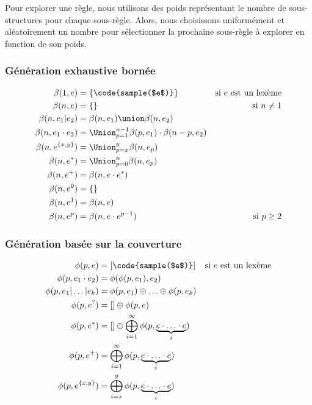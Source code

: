 Pour explorer une règle, nous utilisons des poids représentant le nombre de
sous-structures pour chaque sous-règle. Alors, nous choisissons uniformément et
aléatoirement un nombre pour sélectionner la prochaine sous-règle à explorer en
fonction de son poids.

\subsubsection{Génération exhaustive bornée}
\label{subsection:data:bounded_exaustive_generation}

\begin{align*}
%
\beta(1, e) & =
    \{\code{sample($e$)}\}
    &
    \text{si $e$ est un lexème}
    \\
%
\beta(n, e) & =
    \{\}
    &
    \text{si $n \neq 1$}
    \\
%
\beta(n, e_1 \vert e_2) & =
    \beta(n, e_1) \union \beta(n, e_2)
    \\
%
\beta(n, e_1 \cdot e_2) & =
    \Union_{p = 1}^{n - 1}
    \beta(p, e_1) \cdot \beta(n - p, e_2)
    \\
%
\beta(n, e^{\{x, y\}}) & =
    \Union_{p = x}^y \beta(n, e_p)
    \\
%
\beta(n, e^*) & =
    \Union_{p = 0}^n \beta(n, e_p)
    \\
%
\beta(n, e^+) & =
    \beta(n, e \cdot e^*)
    \\
%
\beta(n, e^0) & =
    \{\}
    \\
%
\beta(n, e^1) & =
    \beta(n, e)
    \\
%
\beta(n, e^p) & =
    \beta(n, e \cdot e^{p - 1})
    &
    \text{si $p \geq 2$}
%
\end{align*}

\subsubsection{Génération basée sur la couverture}
\label{subsection:data:coverage_based_generation}

\begin{align*}
%
\phi(p, e) & =
    [\code{sample($e$)}]
    &
    \text{si $e$ est un lexème}
    \\
%
\phi(p, e_1 \cdot e_2) & =
    \phi(\phi(p, e_1), e_2)
    \\
%
\phi(p, e_1 \vert \dotso \vert e_k) & =
    \phi(p, e_1) \oplus \dotso \oplus \phi(p, e_k)
    \\
%
\phi(p, e^?) & =
    [] \oplus \phi(p, e)
    \\
%
\phi(p, e^*) & =
    [] \oplus \bigoplus_{i = 1}^\infty
    \phi(p, \underbrace{e \cdot \dotso \cdot e}_i)
    \\
%
\phi(p, e^+) & =
    \bigoplus_{i = 1}^\infty \phi(p, \underbrace{e \cdot \dotso \cdot e}_i)
    \\
%
\phi(p, e^{\{x, y\}}) & =
    \bigoplus_{i = x}^y \phi(p, \underbrace{e \cdot \dotso \cdot e}_i)
%
\end{align*}
